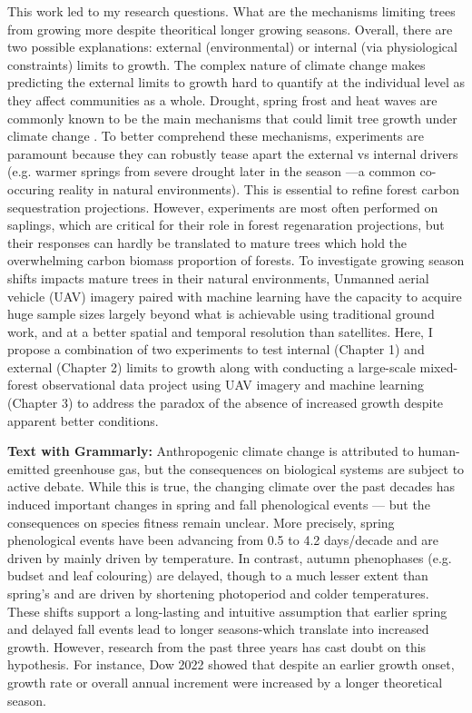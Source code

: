 \documentclass[12pt]{article}
\begin{document}
This work led to my research questions. What are the mechanisms limiting trees from growing more despite theoritical longer growing seasons. Overall, there are two possible explanations: external (environmental) or internal (via physiological constraints) limits to growth. The complex nature of climate change makes predicting the external limits to growth hard to quantify at the individual level as they affect communities as a whole. Drought, spring frost and heat waves are commonly known to be the main mechanisms that could limit tree growth under climate change . To better comprehend these mechanisms, experiments are paramount because they can robustly tease apart the external vs internal drivers (e.g. warmer springs from severe drought later in the season ---a common co-occuring reality in natural environments). This is essential to refine forest carbon sequestration projections. However, experiments are most often performed on saplings, which are critical for their role in forest regenaration projections, but their responses can hardly be translated to mature trees which hold the overwhelming carbon biomass proportion of forests. To investigate growing season shifts impacts mature trees in their natural environments, Unmanned aerial vehicle (UAV) imagery paired with machine learning have the capacity to acquire huge sample sizes largely beyond what is achievable using traditional ground work, and at a better spatial and temporal resolution than satellites. Here, I propose a combination of two experiments to test internal (Chapter 1) and external (Chapter 2) limits to growth along with conducting a large-scale mixed-forest observational data project using UAV imagery and machine learning (Chapter 3) to address the paradox of the absence of increased growth despite apparent better conditions. \\
\par
\textbf {Text with Grammarly:} Anthropogenic climate change is attributed to human-emitted greenhouse gas, but the consequences on biological systems are subject to active debate. While this is true, the changing climate over the past decades has induced important changes in spring and fall phenological events --- but the consequences on species fitness remain unclear. More precisely, spring phenological events have been advancing from 0.5 to 4.2 days/decade and are driven by mainly driven by temperature. In contrast, autumn phenophases (e.g. budset and leaf colouring) are delayed, though to a much lesser extent than spring's and are driven by shortening photoperiod and colder temperatures. These shifts support a long-lasting and intuitive assumption that earlier spring and delayed fall events lead to longer seasons-which translate into increased growth. However, research from the past three years has cast doubt on this hypothesis. For instance, Dow 2022 showed that despite an earlier growth onset, growth rate or overall annual increment were increased by a longer theoretical season. 
\end{document}
